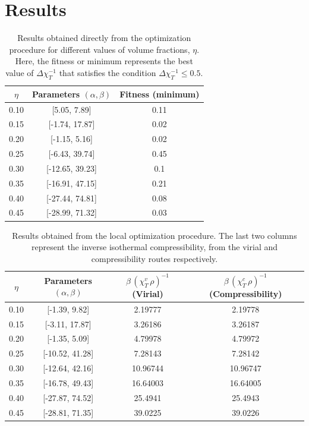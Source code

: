 \section{Results}
\begin{table}
    \centering
    \begin{tabular}{|c|c|c|}
    \hline
    \(\eta\)  & Parameters \(\left(\alpha, \beta\right)\)  & Fitness (minimum)    \\ \hline
    0.10 & {[}5.05, 7.89{]}    & 0.11          \\ \hline
    0.15 & {[}-1.74, 17.87{]}   & 0.02          \\ \hline
    0.20 & {[}-1.15, 5.16{]}    & 0.02   \\ \hline
    0.25 & {[}-6.43, 39.74{]}   & 0.45  \\ \hline
    0.30 & {[}-12.65, 39.23{]} & 0.1  \\ \hline
    0.35 & {[}-16.91, 47.15{]}    & 0.21  \\ \hline
    0.40 & {[}-27.44, 74.81{]}  & 0.08  \\ \hline
    0.45 & {[}-28.99, 71.32{]}  & 0.03 \\ \hline
    \end{tabular}%
    \caption{Results obtained directly from the optimization procedure for different values of volume fractions, \(\eta\). Here, the fitness or minimum represents the best value of \(\Delta \chi^{-1}_{T}\) that satisfies the condition \(\Delta \chi^{-1}_{T} \leq 0.5\).}
    \label{tab:global-opt}
\end{table}

\begin{table}
    \centering
    \begin{tabular}{|c|c|c|c|}
    \hline
    \(\eta\)  & Parameters \(\left(\alpha, \beta\right)\) & \(\beta \, {\left(\chi^{v}_{T} \, \rho\right)}^{-1}\) (Virial)  & \(\beta \, {\left(\chi^{c}_{T} \, \rho\right)}^{-1}\) (Compressibility)  \\ \hline
    0.10 & [-1.39, 9.82]   & 2.19777  & 2.19778 \\ \hline
    0.15 & [-3.11, 17.87]  & 3.26186 & 3.26187  \\ \hline
    0.20 & [-1.35, 5.09]   & 4.79978  & 4.79972  \\ \hline
    0.25 & [-10.52, 41.28] & 7.28143  & 7.28142 \\ \hline
    0.30 & [-12.64, 42.16] & 10.96744 & 10.96747 \\ \hline
    0.35 & [-16.78, 49.43] & 16.64003 & 16.64005 \\ \hline
    0.40 & [-27.87, 74.52] & 25.4941 & 25.4943 \\ \hline
    0.45 & [-28.81, 71.35] & 39.0225  & 39.0226  \\ \hline
    \end{tabular}
    \caption{Results obtained from the local optimization procedure. The last two columns represent the inverse isothermal compressibility, from the virial and compressibility routes respectively.}
    \label{tab:local-opt}
\end{table}

